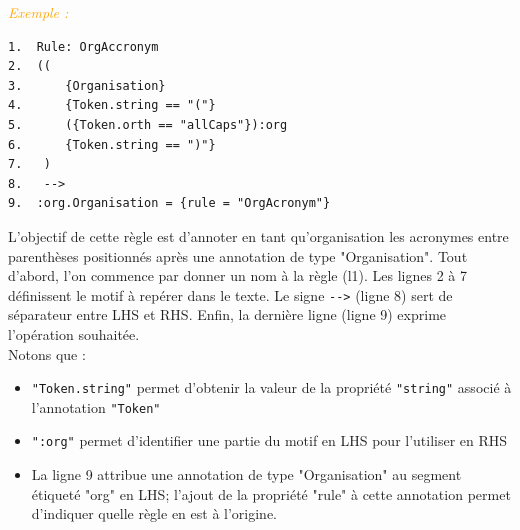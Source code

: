 \documentclass[a4paper, 11pt]{report}
\newenvironment{exemple}
    {
    \textit{\textcolor{orange}{
    Exemple : \\}}
    }
    {~\\
    }
\begin{document}
\begin{exemple}
\begin{verbatim}
1.  Rule: OrgAccronym
2.  ((
3.      {Organisation}
4.      {Token.string == "("}
5.      ({Token.orth == "allCaps"}):org
6.      {Token.string == ")"}
7.   )
8.   -->
9.  :org.Organisation = {rule = "OrgAcronym"}
\end{verbatim}

L'objectif de cette règle est d'annoter en tant qu'organisation les acronymes entre parenthèses positionnés après une annotation de type "Organisation". Tout d'abord, l'on commence par donner un nom à la règle (l1). Les lignes 2 à 7 définissent le motif à repérer dans le texte. Le signe \verb|-->| (ligne 8) sert de séparateur entre LHS et RHS. Enfin, la dernière ligne (ligne 9) exprime l'opération souhaitée.\\
Notons que : 
\begin{itemize}
    \item \verb|"Token.string"| permet d'obtenir la valeur de la propriété \verb|"string"| associé à l'annotation \verb|"Token"|
    \item \verb|":org"| permet d'identifier une partie du motif en LHS pour l'utiliser en RHS
    \item La ligne 9 attribue une annotation de type "Organisation" au segment étiqueté "org" en LHS; l'ajout de la propriété "rule" à cette annotation permet d'indiquer quelle règle en est à l'origine.
\end{itemize}
\end{exemple}
\end{document}

